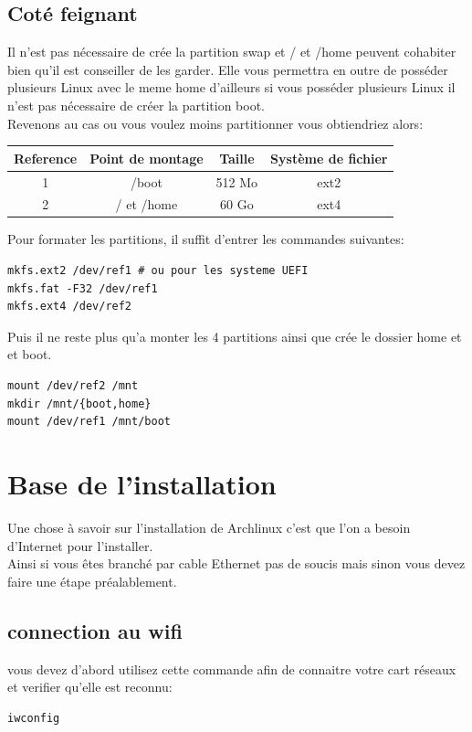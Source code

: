 \documentclass[a4paper]{book}
\begin{document}
\section{Coté feignant}
Il n'est pas nécessaire de crée la partition swap et / et /home peuvent
cohabiter bien qu'il est conseiller de les garder. Elle vous permettra en outre
de posséder plusieurs Linux avec le meme home d'ailleurs si vous posséder
plusieurs Linux il n'est pas nécessaire de créer la partition boot.\\
Revenons au cas ou vous voulez moins partitionner vous obtiendriez alors\@:\\
\begin{tabular*}{\textwidth}{|c|c|c|c}
  Reference & Point de montage & Taille & Système de fichier\\
  \hline
  1 & /boot & 512 Mo & ext2 \\
  \hline
  2 & / et /home & 60 Go & ext4\\
\end{tabular*}
\newline
Pour formater les partitions, il suffit d'entrer les commandes suivantes:\\
\begin{lstlisting}
mkfs.ext2 /dev/ref1 # ou pour les systeme UEFI
mkfs.fat -F32 /dev/ref1 
mkfs.ext4 /dev/ref2
\end{lstlisting}
Puis il ne reste plus qu'a monter les 4 partitions ainsi que crée le dossier
home et et boot.\\
\begin{lstlisting}
mount /dev/ref2 /mnt
mkdir /mnt/{boot,home}
mount /dev/ref1 /mnt/boot
\end{lstlisting}

\chapter{Base de l'installation}
Une chose à savoir sur l'installation de Archlinux c'est que l'on a besoin
d'Internet pour l'installer.\\
Ainsi si vous êtes branch\'e par cable Ethernet pas de soucis mais sinon vous
devez faire une \'etape préalablement.
\section{connection au wifi}
vous devez d'abord utilisez cette commande afin de connaitre votre cart
réseaux et verifier qu'elle est reconnu:\\
\begin{lstlisting}
iwconfig
\end{lstlisting}
\end{document}
